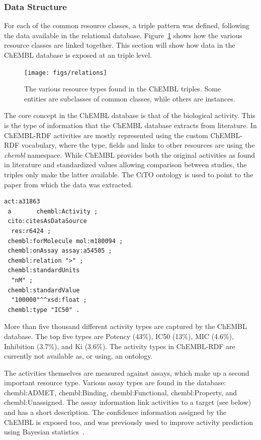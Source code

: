 \documentclass[10pt]{bmc_article}
\newenvironment{bmcformat}{\begin{raggedright}\baselineskip20pt\sloppy\setboolean{publ}{false}}{\end{raggedright}\baselineskip20pt\sloppy}
\begin{document}
\begin{bmcformat}
\subsubsection*{Data Structure}

For each of the common resource classes, a triple pattern was defined, following the
data available in the relational database. Figure~\ref{f1} shows how the various resource
classes are linked together. This section will show how data in the ChEMBL database
is exposed at an triple level.

\begin{figure}[t]
\begin{center}
\texttt{[image: figs/relations]}
\caption{The various resource types found in the ChEMBL triples. Some entities are subclasses
of common classes, while others are instances.}\label{f1}
\end{center}
\end{figure}

The core concept in the ChEMBL database is that of the biological activity. This
is the type of information that the ChEMBL database extracts from literature.
In ChEMBL-RDF activities are mostly represented using the custom ChEMBL-RDF vocabulary, where the
type, fields and links to other resources are using the \textit{chembl}
namespace. While ChEMBL provides both the original activities as found in literature
and standardized values allowing comparison between studies, the triples only
make the latter available. The CiTO ontology is used to point to the paper from
which the data was extracted.

\begin{small}
\begin{verbatim}
act:a31863
 a       chembl:Activity ;
 cito:citesAsDataSource
  res:r6424 ;
 chembl:forMolecule mol:m180094 ;
 chembl:onAssay assay:a54505 ;
 chembl:relation ">" ;
 chembl:standardUnits
  "nM" ;
 chembl:standardValue
  "100000"^^xsd:float ;
 chembl:type "IC50" .
\end{verbatim}
\end{small}

More than five thousand different activity types are captured by the ChEMBL database.
The top five types are Potency (43\%), IC50 (13\%), MIC (4.6\%), Inhibition (3.7\%),
and Ki (3.6\%). The activity types in ChEMBL-RDF are currently not available as, or
using, an ontology.

The activities themselves are measured against assays, which make up a second important
resource type. Various assay types are found in the database: chembl:ADMET, chembl:Binding,
chembl:Functional, chembl:Property, and chembl:Unassigned. The assay information link
activities to a target (see below) and has a short description. The confidence information
assigned by the ChEMBL is exposed too, and was previously used to improve activity
prediction using Bayesian statistics~\cite{Willighagen2011}.


\end{bmcformat}
\end{document}
